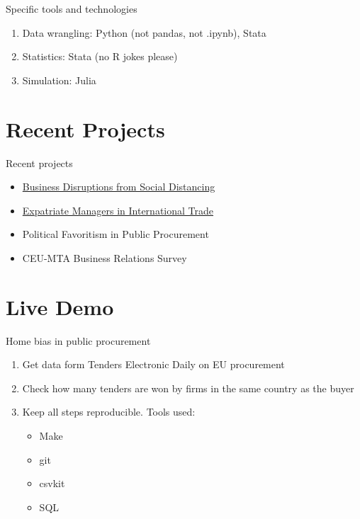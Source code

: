 \documentclass[
  ignorenonframetext,
  aspectratio=54,
]{beamer}
\providecommand{\tightlist}{%
  \setlength{\itemsep}{0pt}\setlength{\parskip}{0pt}}
\begin{document}
\begin{frame}{Specific tools and technologies}
\protect\hypertarget{specific-tools-and-technologies}{}
\begin{enumerate}
\tightlist
\item
  Data wrangling: Python (not pandas, not .ipynb), Stata
\item
  Statistics: Stata (no R jokes please)
\item
  Simulation: Julia
\end{enumerate}
\end{frame}

\hypertarget{recent-projects}{%
\section{Recent Projects}\label{recent-projects}}

\begin{frame}{Recent projects}
\protect\hypertarget{recent-projects-1}{}
\begin{itemize}
\tightlist
\item
  \href{https://github.com/ceumicrodata/social-distancing}{Business
  Disruptions from Social Distancing}
\item
  \href{https://github.com/korenmiklos/expat-analysis}{Expatriate
  Managers in International Trade}
\item
  Political Favoritism in Public Procurement
\item
  CEU-MTA Business Relations Survey
\end{itemize}
\end{frame}

\hypertarget{live-demo}{%
\section{Live Demo}\label{live-demo}}

\begin{frame}{Home bias in public procurement}
\protect\hypertarget{home-bias-in-public-procurement}{}
\begin{enumerate}
\tightlist
\item
  Get data form Tenders Electronic Daily on EU procurement
\item
  Check how many tenders are won by firms in the same country as the
  buyer
\item
  Keep all steps reproducible. Tools used:

  \begin{itemize}
  \tightlist
  \item
    Make
  \item
    git
  \item
    csvkit
  \item
    SQL
  \end{itemize}
\end{enumerate}
\end{frame}
\end{document}
